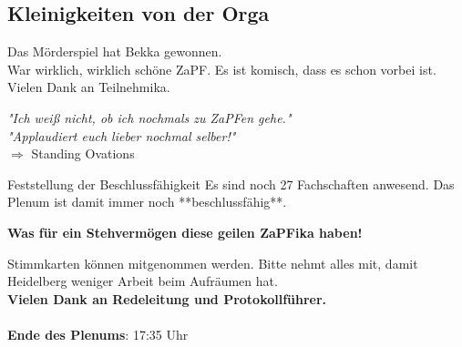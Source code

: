   \subsection{Kleinigkeiten von der Orga}
    Das Mörderspiel hat Bekka gewonnen. \\

    War wirklich, wirklich schöne ZaPF. Es ist komisch, dass es schon vorbei ist.
    Vielen Dank an Teilnehmika. \\

    \begin{center}
      \textit{"Ich weiß nicht, ob ich nochmals zu ZaPFen gehe."} \\
      \textit{"Applaudiert euch lieber nochmal selber!"} \\
      $\Rightarrow$ Standing Ovations
    \end{center}

    \begin{success}{Feststellung der Beschlussfähigkeit}
      Es sind noch 27 Fachschaften anwesend.
      Das Plenum ist damit immer noch **beschlussfähig**.
      \begin{center}
        \textbf{Was für ein Stehvermögen diese geilen ZaPFika haben!}
      \end{center}
    \end{success}

    Stimmkarten können mitgenommen werden. Bitte nehmt alles mit, damit Heidelberg weniger Arbeit beim Aufräumen hat. \\

    \textbf{Vielen Dank an Redeleitung und Protokollführer.} \\ \\

    \textbf{Ende des Plenums}: 17:35 Uhr
